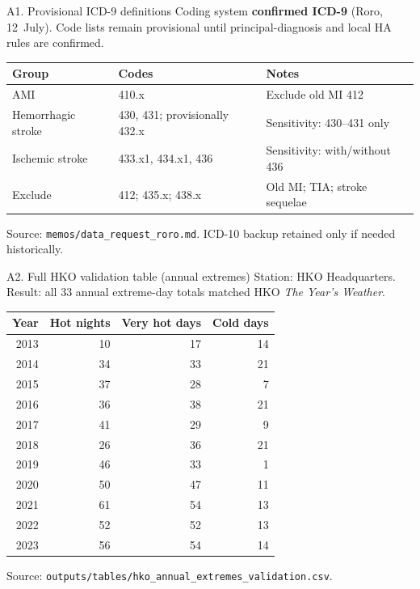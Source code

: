 \documentclass[aspectratio=169,10pt]{beamer}
\begin{document}
\begin{frame}{A1. Provisional ICD-9 definitions}
  \footnotesize
  Coding system \textbf{confirmed ICD-9} (Roro, 12~July). Code lists remain provisional
  until principal-diagnosis and local HA rules are confirmed.

  \vspace{0.45em}
  \begin{tabular}{@{}llp{6.0cm}@{}}
    \toprule
    Group & Codes & Notes \\
    \midrule
    AMI & 410.x & Exclude old MI 412 \\
    Hemorrhagic stroke & 430, 431; provisionally 432.x & Sensitivity: 430--431 only \\
    Ischemic stroke & 433.x1, 434.x1, 436 & Sensitivity: with/without 436 \\
    Exclude & 412; 435.x; 438.x & Old MI; TIA; stroke sequelae \\
    \bottomrule
  \end{tabular}

  \vspace{0.55em}
  \scriptsize Source: \texttt{memos/data\_request\_roro.md}. ICD-10 backup retained only if needed historically.
\end{frame}

\begin{frame}{A2. Full HKO validation table (annual extremes)}
  \footnotesize
  Station: HKO Headquarters. Result: all 33 annual extreme-day totals matched
  HKO \textit{The Year's Weather}.

  \vspace{0.35em}
  \footnotesize
  \begin{tabular}{@{}rrrr@{}}
    \toprule
    Year & Hot nights & Very hot days & Cold days \\
    \midrule
    2013 & 10 & 17 & 14 \\
    2014 & 34 & 33 & 21 \\
    2015 & 37 & 28 & 7 \\
    2016 & 36 & 38 & 21 \\
    2017 & 41 & 29 & 9 \\
    2018 & 26 & 36 & 21 \\
    2019 & 46 & 33 & 1 \\
    2020 & 50 & 47 & 11 \\
    2021 & 61 & 54 & 13 \\
    2022 & 52 & 52 & 13 \\
    2023 & 56 & 54 & 14 \\
    \bottomrule
  \end{tabular}

  \vspace{0.4em}
  \scriptsize Source: \texttt{outputs/tables/hko\_annual\_extremes\_validation.csv}.
\end{frame}
\end{document}
